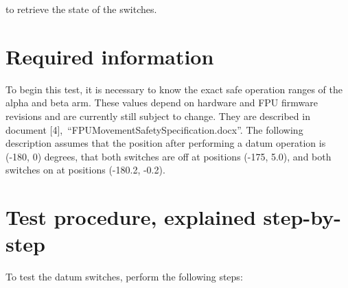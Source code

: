 \documentclass[fontsize=12,a4paper]{scrreprt}
\begin{document}
to retrieve the state of the switches.


\section{Required information}

To begin this test, it is necessary to know the exact safe operation
ranges of the alpha and beta arm. These values depend on hardware and
FPU firmware revisions and are currently still subject to change.
They are described in document
[4],~``FPUMovementSafetySpecification.docx''.  The following
description assumes that the position after performing a datum
operation is (-180\degree, 0\degree) degrees, that both switches are off at
positions (-175\degree, 5.0\degree), and both switches on at positions (-180.2\degree,
-0.2\degree).

\section{Test procedure, explained step-by-step}
To test the datum switches, perform the following steps:
\end{document}
